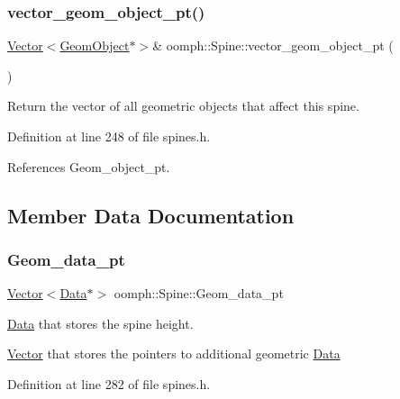 \subsubsection{\texorpdfstring{vector\+\_\+geom\+\_\+object\+\_\+pt()}{vector\_geom\_object\_pt()}}
{\footnotesize\ttfamily \hyperlink{classoomph_1_1Vector}{Vector}$<$\hyperlink{classoomph_1_1GeomObject}{Geom\+Object}$\ast$$>$\& oomph\+::\+Spine\+::vector\+\_\+geom\+\_\+object\+\_\+pt (\begin{DoxyParamCaption}{ }\end{DoxyParamCaption})\hspace{0.3cm}{\ttfamily [inline]}}



Return the vector of all geometric objects that affect this spine. 



Definition at line 248 of file spines.\+h.



References Geom\+\_\+object\+\_\+pt.



\subsection{Member Data Documentation}
\mbox{\label{classoomph_1_1Spine_a50aea4fad1b1e0a3509a2405f3b31ecb}} 
\subsubsection{\texorpdfstring{Geom\+\_\+data\+\_\+pt}{Geom\_data\_pt}}
{\footnotesize\ttfamily \hyperlink{classoomph_1_1Vector}{Vector}$<$\hyperlink{classoomph_1_1Data}{Data}$\ast$$>$ oomph\+::\+Spine\+::\+Geom\+\_\+data\+\_\+pt\hspace{0.3cm}{\ttfamily [private]}}



\hyperlink{classoomph_1_1Data}{Data} that stores the spine height. 

\hyperlink{classoomph_1_1Vector}{Vector} that stores the pointers to additional geometric \hyperlink{classoomph_1_1Data}{Data} 

Definition at line 282 of file spines.\+h.




